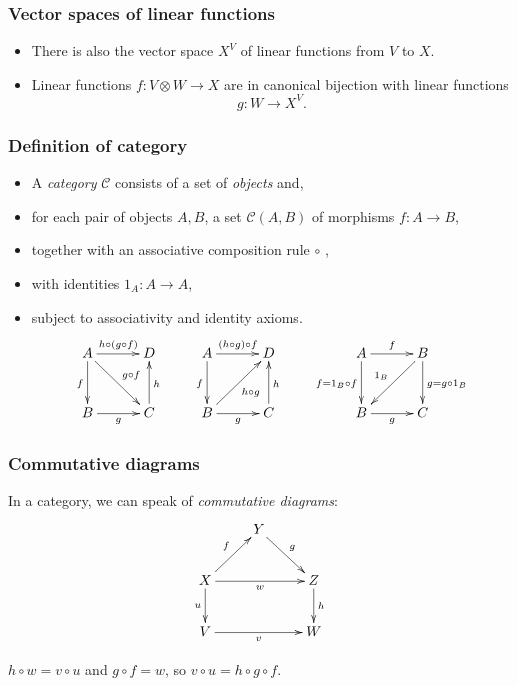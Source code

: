 \documentclass{beamer}
\newcommand{\lra}{\longrightarrow}
\def\CC{{\mathscr C}}
\begin{document}
\begin{frame}
\frametitle{Vector spaces of linear functions}
\begin{itemize}
\item There is also the vector space $X^V$ of linear functions from $V$ to $X$.
\pause
\bigskip
\item
Linear functions $f : V \otimes W  \lra X$ are in canonical bijection with linear functions
\[
g : W  \lra X^V.
\]
\end{itemize}
\end{frame}
\begin{frame}
\frametitle{Definition of category}
\begin{itemize}
\item 
A \emph{category}  $\CC$ consists of a set of \emph{objects} and, 
\pause
\item for each pair of objects $A, B$, a set $\CC (A,B)$ of morphisms $f : A  \lra B$, 
\pause
\item together with an associative composition rule $\circ$ ,
\pause
\item with identities $1_A : A  \lra A$,
\pause
\item subject to associativity and identity axioms.
\[  \xymatrix@R+2mm @C+2mm{
    A \ar[r]^{h \circ (g\circ f)} \ar[d]_f \ar[rd]^{g \circ f} & D   \\
    B \ar[r]_g    & C \ar[u]_h
  } \qquad
  \xymatrix@R+2mm @C+2mm{
    A \ar[r]^{(h \circ g)\circ f} \ar[d]_f  & D   \\
    B \ar[r]_g  \ar[ru]_{h \circ g}  & C \ar[u]_h}
 \qquad
   \xymatrix@R+2mm @C+2mm{
    A \ar[r]^f\ar[d]_{f=1_B \circ f}   & B \ar[ld]_{1_B}  \ar[d]^{g=g\circ 1_B}\\
    B \ar[r]_g     & C }
\]
\end{itemize}
\end{frame}

\begin{frame}
\frametitle{Commutative diagrams}
In a category, we can speak of \emph{commutative diagrams}:
\begin{equation*}
\xymatrix{
& Y \ar[rd]^-{ g}  & \\
X \ar[ru]^-{f} \ar[d]_-{u} \ar[rr]_-{w} & & Z \ar[d]^-{h} \\
V \ar[rr]_-{v} & & W }
\end{equation*}
%
\begin{center}
$h \circ w = v \circ u$ \quad and \quad $g \circ f = w$, \quad
so $v \circ u = h \circ g \circ f$.
\end{center}
\end{frame}
\end{document}
